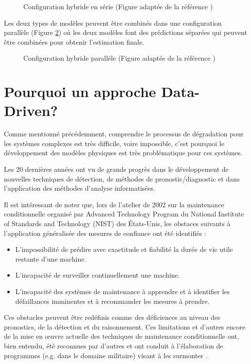 \begin{figure}[H]
    \centering
    
    \caption{Configuration hybride en série (Figure adaptée de la référence \cite{Mangili2013})}
    \label{fig:hybrid-approach-series}
\end{figure}

Les deux types de modèles peuvent être combinés dans une configuration parallèle (Figure \ref{fig:hybrid-approach-parallel}) où les deux modèles font des prédictions séparées qui peuvent être combinées pour obtenir l'estimation finale.
\begin{figure}[H]
    \centering
    
    \caption{Configuration hybride parallèle (Figure adaptée de la référence \cite{Mangili2013})}
    \label{fig:hybrid-approach-parallel}
\end{figure}

\section{Pourquoi un approche Data-Driven?}
Comme mentionné précédemment, comprendre le processus de dégradation pour les systèmes complexes est très difficile, voire impossible, c'est pourquoi le développement des modèles physiques est très problématique pour ces systèmes.

Les 20 dernières années ont vu de grands progrès dans le développement de nouvelles techniques de détection, de méthodes de pronostic/diagnostic et dans l’application des méthodes d’analyse informatisées. 

Il est intéressant de noter que, lors de l’atelier de 2002 sur la maintenance conditionnelle organisé par Advanced Technology Program du National Institute of Standards and Technology (NIST) des États-Unis, les obstaces suivants à l’application généralisée des mesures de confiance ont été identifiés :
\begin{itemize}
    \item L’impossibilité de prédire avec exactitude et fiabilité la durée de vie utile restante d'une machine.
    \item L’incapacité de surveiller continuellement une machine.
    \item L’incapacité des systèmes de maintenance à apprendre et à identifier les défaillances imminentes et à recommander les mesures à prendre.
\end{itemize} 

Ces obstacles peuvent être redéfinis comme des déficiences au niveau des pronostics, de la détection et du raisonnement. Ces limitations et d'autres encore de la mise en œuvre actuelle des techniques de maintenance conditionnelle ont, bien entendu, été reconnues par d'autres et ont conduit à l'élaboration de programmes (e.g. dans le domaine militaire) visant à les surmonter \cite{Hess2008}.

